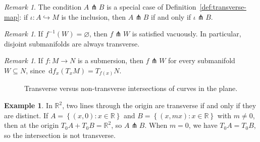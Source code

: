 \documentclass[12pt,a4paper,openany]{book}
\theoremstyle{definition}
\newtheorem{example}[theorem]{Example}
\theoremstyle{remark}
\newtheorem{remark}[theorem]{Remark}
\newcommand{\R}{\mathbb{R}}
\newcommand{\dd}{\,\mathrm{d}}
\newcommand{\set}[1]{\left\{ #1 \right\}}
\begin{document}
\begin{remark}\label{rem:transverse-inclusion}
The condition $A \pitchfork B$ is a special case of
Definition~\ref{def:transverse-map}: if $\iota \colon A \hookrightarrow M$
is the inclusion, then $A \pitchfork B$ if and only if $\iota \pitchfork B$.
\end{remark}

\begin{remark}\label{rem:transverse-empty}
If $f^{-1}(W) = \varnothing$, then $f \pitchfork W$ is satisfied
vacuously. In particular, disjoint submanifolds are always transverse.
\end{remark}

\begin{remark}\label{rem:transverse-submersion}
If $f \colon M \to N$ is a submersion, then $f \pitchfork W$ for every
submanifold $W \subseteq N$, since $\dd f_x(T_x M) = T_{f(x)} N$.
\end{remark}

\begin{figure}[ht]
\centering
{}
\caption{Transverse versus non-transverse intersections of curves in the plane.}
\label{fig:transverse-nontransverse}
\end{figure}

\begin{example}\label{ex:transverse-lines}
In $\R^2$, two lines through the origin are transverse if and only if they
are distinct. If $A = \set{(x,0) : x \in \R}$ and
$B = \set{(x,mx) : x \in \R}$ with $m \neq 0$, then at the origin
$T_0 A + T_0 B = \R^2$, so $A \pitchfork B$. When $m = 0$, we have
$T_0 A = T_0 B$, so the intersection is not transverse.
\end{example}
\end{document}
